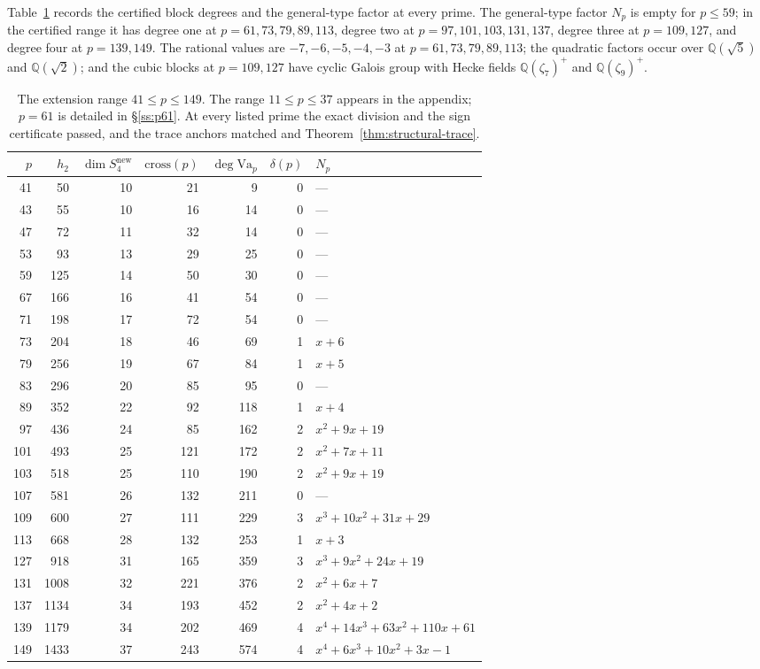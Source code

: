 \documentclass[10pt,a4paper]{amsart}
\newcommand{\Q}{\mathbb{Q}}
\newcommand{\Va}{\mathrm{Va}}
\newcommand{\snew}{S^{\mathrm{new}}}
\providecommand{\Va}{\mathrm{Va}}
\providecommand{\snew}{S^{\mathrm{new}}}
\begin{document}
	Table~\ref{tab:ext} records the certified block degrees and the
	general-type factor at every prime. The general-type factor $N_p$ is empty
	for $p\le59$; in the certified range it has degree one at
	$p=61,73,79,89,113$, degree two at $p=97,101,103,131,137$, degree three
	at $p=109,127$, and degree four at $p=139,149$. The rational values are
	$-7,-6,-5,-4,-3$ at $p=61,73,79,89,113$; the quadratic factors occur over
	$\Q(\sqrt5)$ and $\Q(\sqrt2)$; and the cubic blocks at $p=109,127$ have
	cyclic Galois group with Hecke fields $\Q(\zeta_7)^+$ and
	$\Q(\zeta_9)^+$.
	
	\begin{table}[ht]
		\centering
		\small
		\begin{tabular}{@{}rrrrrrl@{}}
			\toprule
			$p$ & $h_2$ & $\dim\snew_4$ & $\mathrm{cross}(p)$ & $\deg\Va_p$ &
			$\delta(p)$ & $N_p$\\
			\midrule
			41 & 50 & 10 & 21 & 9 & 0 & ---\\
			43 & 55 & 10 & 16 & 14 & 0 & ---\\
			47 & 72 & 11 & 32 & 14 & 0 & ---\\
			53 & 93 & 13 & 29 & 25 & 0 & ---\\
			59 & 125 & 14 & 50 & 30 & 0 & ---\\
			67 & 166 & 16 & 41 & 54 & 0 & ---\\
			71 & 198 & 17 & 72 & 54 & 0 & ---\\
			73 & 204 & 18 & 46 & 69 & 1 & $x+6$\\
			79 & 256 & 19 & 67 & 84 & 1 & $x+5$\\
			83 & 296 & 20 & 85 & 95 & 0 & ---\\
			89 & 352 & 22 & 92 & 118 & 1 & $x+4$\\
			97 & 436 & 24 & 85 & 162 & 2 & $x^2+9x+19$\\
			101 & 493 & 25 & 121 & 172 & 2 & $x^2+7x+11$\\
			103 & 518 & 25 & 110 & 190 & 2 & $x^2+9x+19$\\
			107 & 581 & 26 & 132 & 211 & 0 & ---\\
			109 & 600 & 27 & 111 & 229 & 3 & $x^3+10x^2+31x+29$\\
			113 & 668 & 28 & 132 & 253 & 1 & $x+3$\\
			127 & 918 & 31 & 165 & 359 & 3 & $x^3+9x^2+24x+19$\\
			131 & 1008 & 32 & 221 & 376 & 2 & $x^2+6x+7$\\
			137 & 1134 & 34 & 193 & 452 & 2 & $x^2+4x+2$\\
			139 & 1179 & 34 & 202 & 469 & 4 & $x^4+14x^3+63x^2+110x+61$\\
			149 & 1433 & 37 & 243 & 574 & 4 & $x^4+6x^3+10x^2+3x-1$\\
			\bottomrule
		\end{tabular}
		\caption{The extension range $41\le p\le149$. The range $11\le p\le37$
			appears in the appendix; $p=61$ is detailed in \S\ref{ss:p61}. At every
			listed prime the exact division and the sign certificate passed, and the
			trace anchors matched \cite[Thm.~2, Rem.~3]{IbukiyamaKatsura} and
			Theorem~\ref{thm:structural-trace}.}
		\label{tab:ext}
	\end{table}
	
\end{document}
